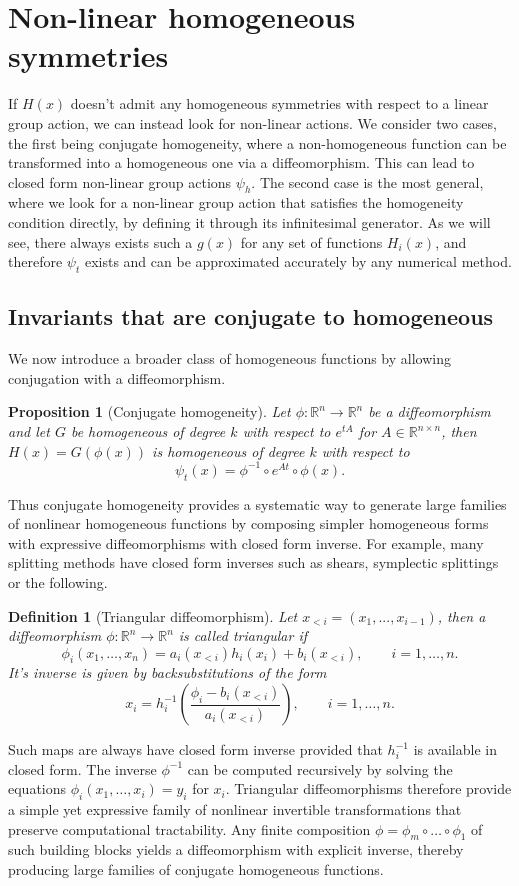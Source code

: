 \documentclass[final,3p,times]{elsarticle}
\newtheorem{definition}[theorem]{Definition}
\newtheorem{proposition}[theorem]{Proposition}
\newcommand{\R}{\mathbb{R}}
\begin{document}
\section{Non-linear homogeneous symmetries}\label{sec:nonlinear homogeneous symmetries}
If $H(x)$ doesn't admit any homogeneous symmetries with respect to a linear group action, we can instead look for non-linear actions. We consider two cases, the first being conjugate homogeneity, where a non-homogeneous function can be transformed into a homogeneous one via a diffeomorphism. This can lead to closed form non-linear group actions $\psi_h$. The second case is the most general, where we look for a non-linear group action that satisfies the homogeneity condition directly, by defining it through its infinitesimal generator. As we will see, there always exists such a $g(x)$ for any set of functions $H_i(x)$, and therefore $\psi_t$ exists and can be approximated accurately by any numerical method.

\subsection{Invariants that are conjugate to homogeneous}
We now introduce a broader class of homogeneous functions by allowing conjugation with a diffeomorphism. 

\begin{proposition}[Conjugate homogeneity]\label{prop:conj hom}
Let $\phi:\R^n\to\R^n$ be a diffeomorphism and let $G$ be homogeneous of degree $k$ with respect to $e^{tA}$ for $A\in\R^{n\times n}$, then $H(x) = G(\phi(x))$ is homogeneous of degree $k$ with respect to  
$$ 
    \psi_t(x) = \phi^{-1}\!\circ e^{At}\circ\phi(x). 
$$
\end{proposition}
Thus conjugate homogeneity provides a systematic way to generate large families of nonlinear homogeneous functions by composing simpler homogeneous forms with expressive diffeomorphisms with closed form inverse. For example, many splitting methods have closed form inverses such as shears, symplectic splittings \cite{mclachlan2004explicit} or the following. 

\begin{definition}[Triangular diffeomorphism] 
Let $x_{<i} = (x_1,...,x_{i-1})$, then a diffeomorphism $\phi:\R^n\to\R^n$ is called \emph{triangular} if
$$\phi_i(x_1,\dots,x_n) = a_i(x_{<i})h_i(x_i) + b_i(x_{<i}), \qquad i=1,\dots,n.$$
It's inverse is given by backsubstitutions of the form 
$$x_i = h_i^{-1}\!\left(\frac{\phi_i - b_i(x_{<i})}{a_i(x_{<i})}\right), \qquad i=1,\dots,n.$$
\end{definition}
Such maps are always have closed form inverse provided that $h_i^{-1}$ is available in closed form. The inverse $\phi^{-1}$ can be computed recursively by solving the equations $\phi_i(x_1,\dots,x_i)=y_i$ for $x_i$. Triangular diffeomorphisms therefore provide a simple yet expressive family of nonlinear invertible transformations that preserve computational tractability. Any finite composition $\phi=\phi_m\circ\dots\circ\phi_1$ of such building blocks yields a diffeomorphism with explicit inverse, thereby producing large families of conjugate homogeneous functions. 
\end{document}
